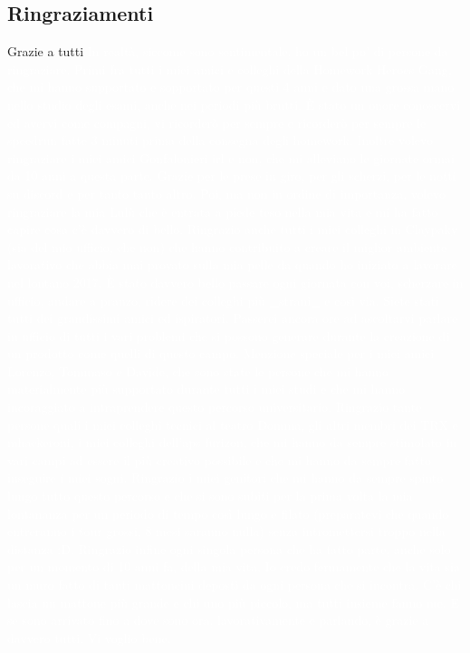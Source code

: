 \documentclass[main.tex]{subfiles}
\begin{document}
\clearpage
\subsection{Ringraziamenti}\label{subsec:6_thank}
Grazie a tutti
\newline
\textcolor{white}{In realtà, siccome sono sentimentale, ho un bel po' di persone da ringraziare. Primi fra tutti i miei amici e colleghi della Homework Heroes Gang, che mi hanno supportato e sopportato per questi 4 anni e dato una grossa mano nello studio degli esami, anche nei periodi più brutti. È stato un onore conoscervi ed avervi come compagni, vi ricorderò per sempre e ricorderò per sempre le speedrun fatte 3 minuti prima della consegna degli homework. Inoltre volevo ringraziare i miei amici Gonfalonieri irl e non, che mi alleviano le giornate ormai da 10 anni a questa parte. Grazie per le prese in giro, per gli scherzi, per le notti su discord e per tanto tanto altro. Poi, ma non in ordine di importanza, volevo ringraziare la mia Lulù che è entrata a piede teso nella mia vita e mi ha fatto capire cosa c'è davvero di bello. Ringrazio anche tutti i miei colleghi in Claypaky (sia del mio ufficio, che non) che hanno contribuito a creare il miglior ambiente lavorativo che abbia mai provato sulla mia pelle da quando ho iniziato a lavorare nel lontano 2017. È stato davvero bello passare ogni giornata con voi, scherzare in ufficio, andare a pranzo, ridere dei colleghi più \_strani\_ e così via. Siete stati tutti dei grandissimi amici ed ispiratori. Passerei ancora ore ad ascoltarvi parlare in ufficio di tutti i vari problemi che si possono generare durante la creazione di un prodotto come quelli di questo campo. Menzione speciale per i miei amici Lorenzo, Tommaso e Davide, che sono state le persone che mi hanno materialmente più supportato durante tutti i miei studi e che mi hanno incoraggiato a intraprendere questo percorso universitario. Ringrazio tante persone quali i miei colleghi tecnici al teatro Domma, gli altri membri dei TRX e mhackeroni, i miei colleghi dell'aps furizon, che mi hanno da sempre stimolato in vari campi ad essere il più creativo possibile e che mi hanno da sempre fatto inseguire i miei sogni. Ringrazio i miei genitori che mi hanno da sempre spinto lungo tutto questo percorso e che si sono subiti per la prima volta la mia lontananza per un periodo di tempo così lungo e filato (preparatevi che quando entreranno i tour grossi, 8 mesi saranno nulla) senza intromettersi troppo nella distanza :D. Ringrazio infine ogni singola persona che ha fatto parte, anche solo per un momento di 10 anni fa, della mia vita. Io credo fermamente che la vita sia un muro fatto di tanti mattoncini deposti da ogni persona che si incontra. C'è chi lascia un mattone più grande e chi uno più piccolo, ma tutti insieme fanno me. E se sono arrivato fino a dove sono ora, lavorativamente e  parlando, è grazie a davvero tutti. Vi voglio bene.}
\clearpage
\end{document}
